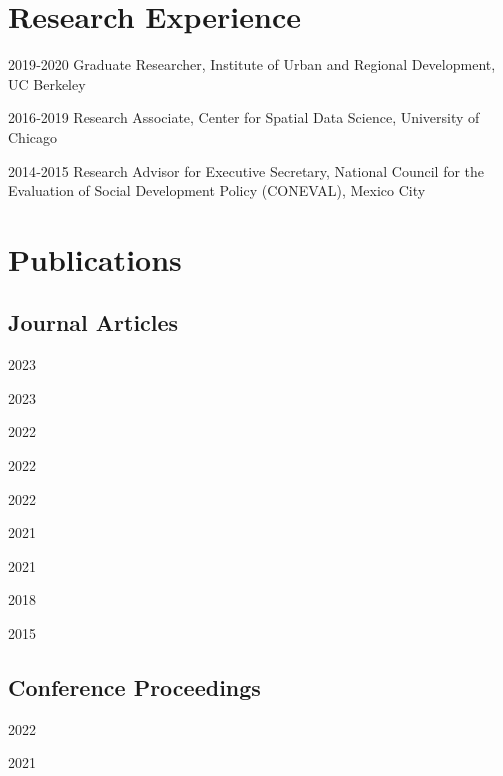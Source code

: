 \documentclass[12pt,letterpaper]{report}
\begin{document}
    \section*{Research Experience}
    \begin{tablist}
        \item[2019‐2020] \tab{}Graduate Researcher, Institute of Urban and Regional Development, UC Berkeley
        \item[2016‐2019] \tab{}Research Associate, Center for Spatial Data Science, University of Chicago
        \item[2014‐2015] \tab{}Research Advisor for Executive Secretary, National Council for the Evaluation of Social Development Policy (CONEVAL), Mexico City
    \end{tablist}

    \section*{Publications}
    \subsection*{Journal Articles}
    \begin{tablist}
        \item[2023] \tab{}
        \item[2023] \tab{}
        \item[2022] \tab{}
        \item[2022] \tab{}
        \item[2022] \tab{} 
        \item[2021] \tab{}
        \item[2021] \tab{}
        \item[2018] \tab{}
        \item[2015] \tab{}
    \end{tablist}

    \subsection*{Conference Proceedings}
    \begin{tablist}
        \item[2022] \tab{}
        \item[2021] \tab{}
    \end{tablist}
\end{document}
